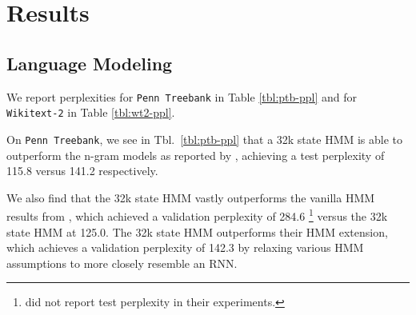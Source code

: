 \documentclass[11pt,a4paper]{article}
\begin{document}
\begin{comment}
\paragraph{Implementation}
We train two-layer LSTM recurrent neural networks with 256 units,
as well as two-layer feed-forward neural networks with 256 units.
The HMMs we train follow the sparsity constraints outlined in the previous
section with a dropout rate of 0.5,
and we vary the total number of states as well as states per word.
We optimize all models with AdamW \citep{adamw}.

We experimented with a couple batching strategies:
On \texttt{Penn Treebank},
the first strategy discarded the inter-sentence dependencies and shuffled all sentences,
and the second treated the corpus as a single flat document without shuffling.
On \texttt{Wikitext2}, we either shuffled at the document level or treated the corpus as a
single document.
Prior work on both corpuses treated the corpora as single documents.

See Appendix \ref{sec:hyperparams} for the hyperparameters for all models.
\end{comment}

\section{Results}
\subsection{Language Modeling}
We report perplexities 
for \texttt{Penn Treebank} in Table \ref{tbl:ptb-ppl}
and for \texttt{Wikitext-2} in Table \ref{tbl:wt2-ppl}.

On \texttt{Penn Treebank}, we see in Tbl.~\ref{tbl:ptb-ppl}
that a 32k state HMM is able to outperform the n-gram models
as reported by \citet{mikolov2012rnn}, achieving a test perplexity of
115.8 versus 141.2 respectively.

We also find that the 32k state HMM vastly outperforms the vanilla HMM results from \citet{buys2018hmm},
which achieved a validation perplexity of 284.6
\footnote{\citet{buys2018hmm} did not report test perplexity in their experiments.}
versus the 32k state HMM at 125.0.
The 32k state HMM outperforms their HMM extension, which achieves a
validation perplexity of 142.3 by relaxing various HMM assumptions
to more closely resemble an RNN.
\end{document}
